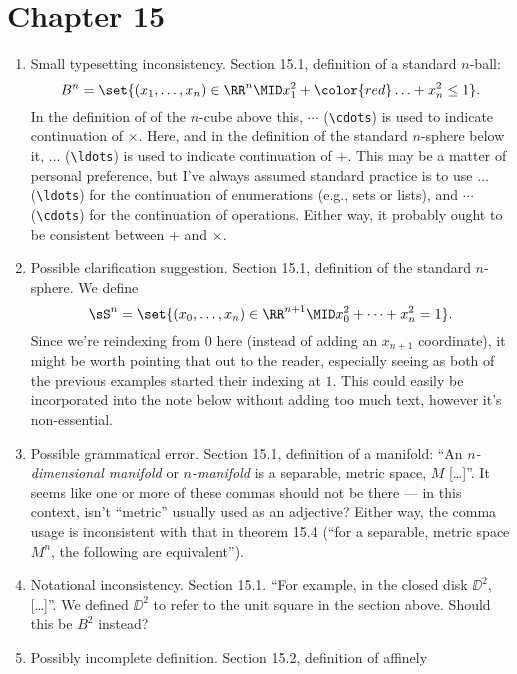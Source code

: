 \documentclass{fkletter}
\begin{document}
\section*{Chapter 15}
\begin{enumerate}
  \item Small typesetting inconsistency. Section 15.1, definition of a standard
    $n$-ball:
    \[
      B^n = \set{(x_1, \ldots, x_n) \in \RR^n \MID x_1^2 + {\color{red} \ldots}
        + x_n^2 \leq 1}.
    \]
    In the definition of of the $n$-cube above this, {\color{red}$\cdots$
    (\verb|\cdots|) is used to indicate continuation of $\times$. Here, and in
    the definition of the standard $n$-sphere below it, $\ldots$ (\verb|\ldots|)
    is used to indicate continuation of $+$.} This may be a matter of personal
    preference, but I've always assumed standard practice is to use $\ldots$
    (\verb|\ldots|) for the continuation of enumerations (e.g., sets or lists),
    and $\cdots$ (\verb|\cdots|) for the continuation of operations. Either way,
    it probably ought to be consistent between $+$ and $\times$.
  \item Possible clarification suggestion. Section 15.1, definition of the
    standard $n$-sphere. We define
    \[
      \sS^n = \set{(x_0, \ldots, x_n) \in \RR^{n+1} \MID x_0^2 + \cdots + x_n^2
        = 1}.
    \]
    {\color{red}Since we're reindexing from $0$ here (instead of adding an
      $x_{n+1}$ coordinate), it might be worth pointing that out to the reader,
      especially seeing as both of the previous examples started their indexing
      at $1$.} This could easily be incorporated into the note below without
    adding too much text, however it's non-essential.
  \item Possible grammatical error. Section 15.1, definition of a manifold: ``An
    \emph{$n$-dimensional manifold} or \emph{$n$-manifold} is a {\color{red}
      separable, metric space, $M$} [\ldots]''. It seems like one or more of
    these commas should not be there --- in this context, isn't ``metric'' usually
    used as an adjective? Either way, the comma usage is inconsistent with that
    in theorem 15.4 (``for a separable, metric space $M^n$, the following are
    equivalent'').
  \item Notational inconsistency. Section 15.1. ``For example, in the
    {\color{red} closed disk $\DD^2$}, [\ldots]''. We defined $\DD^2$ to refer
    to the unit square in the section above. Should this be $B^2$ instead?
  \item Possibly incomplete definition. Section 15.2, definition of affinely

\end{enumerate}
\end{document}
